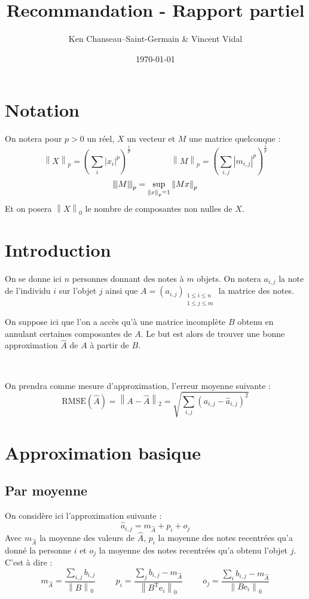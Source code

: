 \documentclass[10pt, a4paper]{article}
\newcommand{\B}{B} %
\newcommand{\Ap}{\widehat{A}} %
\newcommand{\Ac}[2]{a_{#1,#2}} %
\newcommand{\Bc}[2]{b_{#1,#2}} %
\newcommand{\Apc}[2]{\widehat{a}_{#1,#2}} %
\newcommand{\rmse}[1]{\mathrm{RMSE}\pp{#1}} %
\newcommand{\norme}[2]{\left\lVert #1 \right\rVert_{#2}} %
\newcommand{\tnorme}[2]{\left|\hspace{-1pt}\left\lVert #1 \right\rVert\hspace{-1pt}\right|_{#2}} %
\newcommand{\tr}[1]{#1^{\mathrm{T}}} %
\newcommand{\ei}[1]{\mathrm{e}_i} %
\newcommand{\pp}[1]{\left(#1\right)} %
\newcommand{\nl}{

~

} %
\begin{document}
\title{Recommandation - Rapport partiel}
\author{Ken Chanseau--Saint-Germain \& Vincent Vidal}
\date{\today}
\maketitle

\tableofcontents

\section*{Notation}
On notera pour $p>0$ un réel, $X$ un vecteur et $M$ une matrice quelconque : \[
	\norme{X}{p} = \pp{\sum_i \left|x_i\right|^p}^{\frac{1}{p}} \hspace{2cm} 
	\norme{M}{p} = \pp{\sum_{i, j} \left|m_{i,j}\right|^p}^{\frac{1}{p}}
\]\[
	\tnorme{M}{p} = \sup_{\norme{x}{p}=1} \norme{Mx}{p}
\]
Et on posera $\norme{X}{0}$ le nombre de composantes non nulles de $X$. 

\section{Introduction}

On se donne ici $n$ personnes donnant des notes à $m$ objets.\newline
On notera $\Ac{i}{j}$ la note de l'individu $i$ sur l'objet $j$ ainsi que $A = \pp{\Ac{i}{j}}_{\substack{1\leq i\leq n \\ 1 \leq j \leq m}}$ la matrice des notes.

On suppose ici que l'on a accès qu'à une matrice incomplète $\B$ obtenu en annulant certaines composantes de $A$. Le but est alors de trouver une bonne approximation $\Ap$ de $A$ à partir de $\B$.

\nl

On prendra comme mesure d'approximation, l'erreur moyenne suivante :
\[
	\rmse{\Ap} = \norme{A-\Ap}{2} = \sqrt{\sum_{i,j} \pp{\Ac{i}{j} - \Apc{i}{j}}^2}
\]

\section{Approximation basique}
\subsection{Par moyenne}

On considère ici l'approximation suivante : \[
\Apc{i}{j} = m_{\Ap} + p_i + o_j
\]
Avec $m_{\Ap}$ la moyenne des valeurs de $\Ap$, $p_i$ la moyenne des notes recentrées qu'a donné la personne $i$ et $o_j$ la moyenne des notes recentrées qu'a obtenu l'objet $j$. C'est à dire : \[
	m_{\Ap} = \frac{\sum_{i,j}\Bc{i}{j}}{\norme{\B}{0}}  \hspace{1cm}
	p_i = \frac{\sum_{j}\Bc{i}{j} - m_{\Ap}}{\norme{\tr{\B}\ei{i}}{0}} \hspace{1cm}
	o_j = \frac{\sum_{i}\Bc{i}{j} - m_{\Ap}}{\norme{\B\ei{j}}{0}}
\]
\end{document}
